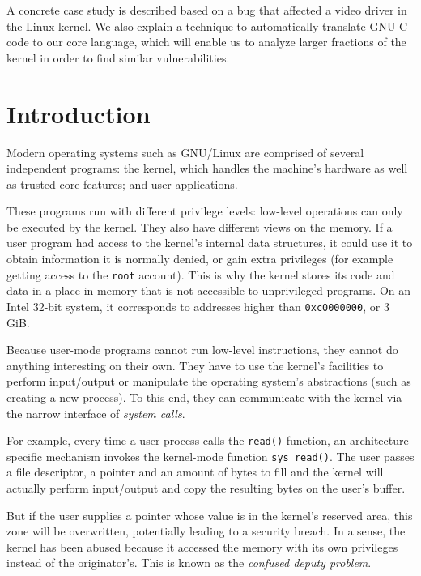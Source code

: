 A concrete case study is described based on a bug that affected a video driver
in the Linux kernel. We also explain a technique to automatically translate GNU
C code to our core language, which will enable us to analyze larger fractions of
the kernel in order to find similar vulnerabilities.

\section{Introduction}

Modern operating systems such as GNU/Linux are comprised of several independent
programs: the kernel, which handles the machine's hardware as well as trusted
core features; and user applications.

These programs run with different privilege levels: low-level operations can
only be executed by the kernel. They also have different views on the memory. If
a user program had access to the kernel's internal data structures, it could use
it to obtain information it is normally denied, or gain extra privileges (for
example getting access to the \texttt{root} account). This is why the kernel
stores its code and data in a place in memory that is not accessible to
unprivileged programs. On an Intel 32-bit system, it corresponds to addresses
higher than \texttt{0xc0000000}, or 3 GiB.

Because user-mode programs cannot run low-level instructions, they cannot do
anything interesting on their own. They have to use the kernel's facilities to
perform input/output or manipulate the operating system's abstractions (such as
creating a new process). To this end, they can communicate with the kernel
via the narrow interface of \emph{system calls}.

For example, every time a user process calls the \texttt{read()} function, an
architecture-specific mechanism invokes the kernel-mode function
\texttt{sys\_read()}. The user passes a file descriptor, a pointer and an amount
of bytes to fill and the kernel will actually perform input/output and copy the
resulting bytes on the user's buffer.

But if the user supplies a pointer whose value is in the kernel's reserved area,
this zone will be overwritten, potentially leading to a security breach. In a
sense, the kernel has been abused because it accessed the memory with its own
privileges instead of the originator's. This is known as the \emph{confused
deputy problem}\cite{hardy88confused}.

